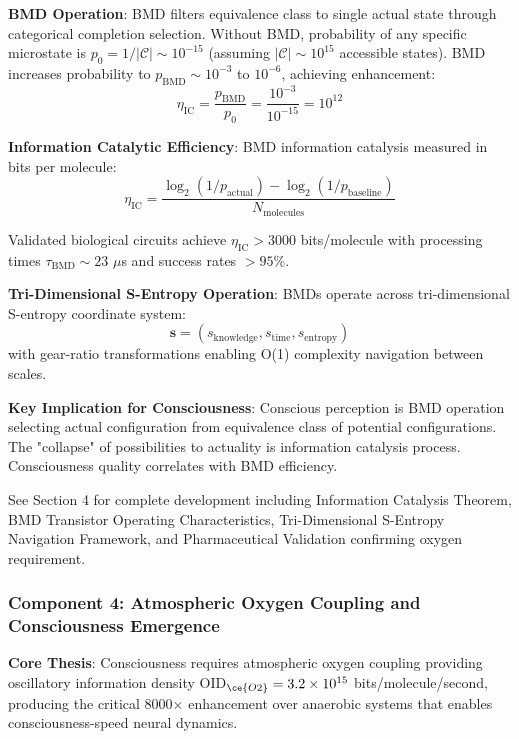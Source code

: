 \documentclass[11pt,onecolumn]{article}
\begin{document}
\textbf{BMD Operation}: BMD filters equivalence class to single actual state through categorical completion selection. Without BMD, probability of any specific microstate is $p_0 = 1/|\mathcal{C}| \sim 10^{-15}$ (assuming $|\mathcal{C}| \sim 10^{15}$ accessible states). BMD increases probability to $p_{\text{BMD}} \sim 10^{-3}$ to $10^{-6}$, achieving enhancement:
\begin{equation}
\eta_{\text{IC}} = \frac{p_{\text{BMD}}}{p_0} = \frac{10^{-3}}{10^{-15}} = 10^{12}
\end{equation}

\textbf{Information Catalytic Efficiency}: BMD information catalysis measured in bits per molecule:
\begin{equation}
\eta_{\text{IC}} = \frac{\log_2(1/p_{\text{actual}}) - \log_2(1/p_{\text{baseline}})}{N_{\text{molecules}}}
\end{equation}

Validated biological circuits achieve $\eta_{\text{IC}} > 3000$ bits/molecule with processing times $\tau_{\text{BMD}} \sim 23$ $\mu$s and success rates $> 95\%$.

\textbf{Tri-Dimensional S-Entropy Operation}: BMDs operate across tri-dimensional S-entropy coordinate system:
\begin{equation}
\mathbf{s} = (s_{\text{knowledge}}, s_{\text{time}}, s_{\text{entropy}})
\end{equation}
with gear-ratio transformations enabling O(1) complexity navigation between scales.

\textbf{Key Implication for Consciousness}: Conscious perception is BMD operation selecting actual configuration from equivalence class of potential configurations. The "collapse" of possibilities to actuality is information catalysis process. Consciousness quality correlates with BMD efficiency.

See Section 4 for complete development including Information Catalysis Theorem, BMD Transistor Operating Characteristics, Tri-Dimensional S-Entropy Navigation Framework, and Pharmaceutical Validation confirming oxygen requirement.

\subsubsection{Component 4: Atmospheric Oxygen Coupling and Consciousness Emergence}

\textbf{Core Thesis}: Consciousness requires atmospheric oxygen coupling providing oscillatory information density OID$_{\ce{O2}} = 3.2 \times 10^{15}$ bits/molecule/second, producing the critical 8000$\times$ enhancement over anaerobic systems that enables consciousness-speed neural dynamics.
\end{document}
